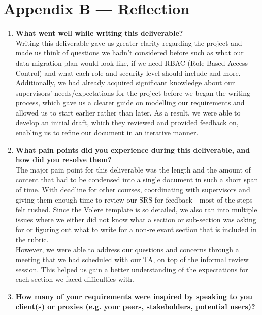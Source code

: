 \documentclass[12pt]{article}
\begin{document}
\newpage{}
\section{Appendix B --- Reflection}


\begin{enumerate}
  \item \textbf{What went well while writing this deliverable?}\\
  
  Writing this deliverable gave us greater clarity regarding the project and made us think of questions we hadn't
  considered before such as what our data migration plan would look like, if we need RBAC (Role Based Access Control) and what each role 
  and security level should include and more.\\

  Additionally, we had already acquired significant knowledge about our supervisors' needs/expectations for the project before we began the 
  writing process, which gave us a clearer guide on modelling our requirements and allowed us to start earlier rather than later. As a result, 
  we were able to develop an initial draft, which they reviewed and provided feedback on, enabling us to refine our document in an iterative manner.
  \item \textbf{What pain points did you experience during this deliverable, and how did you resolve them?}\\
  
  The major pain point for this deliverable was the length and the amount of content that had to be condensed into a single document in such a short
  span of time. With deadline for other courses, coordinating with supervisors and giving them enough time to review our SRS for feedback - most of
  the steps felt rushed. Since the Volere template is so detailed, we also ran into multiple issues where we either did not know what a section or
  sub-section was asking for or figuring out what to write for a non-relevant section that is included in the rubric.\\

  However, we were able to address our questions and concerns through a meeting that we had scheduled with our TA, on top of the informal review session.
  This helped us gain a better understanding of the expectations for each section we faced difficulties with.
  \item \textbf{How many of your requirements were inspired by speaking to you client(s) or proxies (e.g. your peers,
  stakeholders, potential users)?}\\


\end{enumerate}
\end{document}

